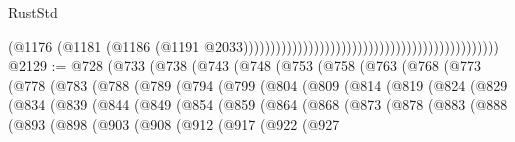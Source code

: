 \begin{lexlean}{RustStd}
\begin{coremodule}
{\begin{coremodule}
{{{{{{{{{{{{                                                                                          (@1176
                                                                                            (@1181
                                                                                              (@1186
                                                                                                (@1191
                                                                                                  @2033)))))))))))))))))))))))))))))))))))))))))))))))
@2129 := @728
    (@733
      (@738
        (@743
          (@748
            (@753
              (@758
                (@763
                  (@768
                    (@773
                      (@778
                        (@783
                          (@788
                            (@789
                              (@794
                                (@799
                                  (@804
                                    (@809
                                      (@814
                                        (@819
                                          (@824
                                            (@829
                                              (@834
                                                (@839
                                                  (@844
                                                    (@849
                                                      (@854
                                                        (@859
                                                          (@864
                                                            (@868
                                                              (@873
                                                                (@878
                                                                  (@883
                                                                    (@888
                                                                      (@893
                                                                        (@898
                                                                          (@903
                                                                            (@908
                                                                              (@912
                                                                                (@917
                                                                                  (@922
                                                                                    (@927
}}}}}}}}}}}}
\end{coremodule}}
\end{coremodule}
\end{lexlean}
